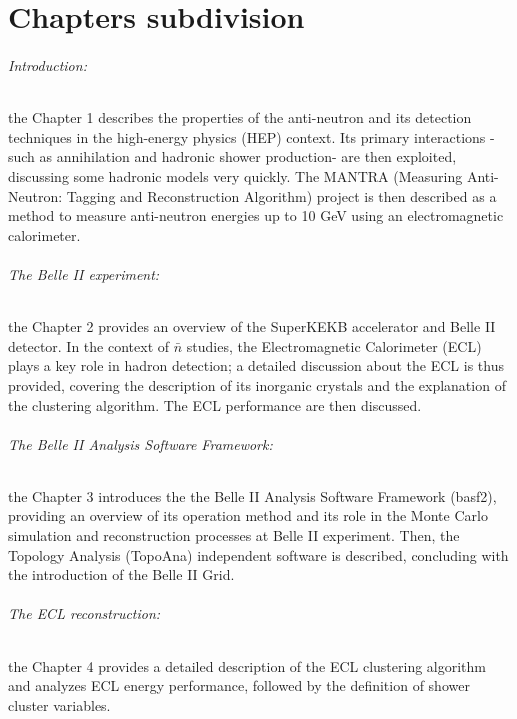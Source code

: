 \setcounter{subsection}{0} 
\part{Chapters subdivision}
\paragraph{Introduction:} the Chapter 1 describes the properties of the anti-neutron and its detection techniques in the high-energy physics (HEP) context. Its primary interactions -such as annihilation and hadronic shower production- are then exploited, discussing some hadronic models very quickly. The MANTRA (Measuring Anti-Neutron: Tagging and Reconstruction Algorithm) project is then described as a method to measure anti-neutron energies up to 10 GeV using an electromagnetic calorimeter.

\paragraph{The Belle II experiment:} the Chapter 2 provides an overview of the SuperKEKB accelerator and Belle II detector. In the context of $\bar{n}$ studies, the Electromagnetic Calorimeter (ECL) plays a key role in hadron detection; a detailed discussion about the ECL is thus provided, covering the description of its inorganic crystals and the explanation of the clustering algorithm. The ECL performance are then discussed.


\paragraph{The Belle II Analysis Software Framework:} the Chapter 3 introduces the the Belle II Analysis Software Framework (basf2), providing an overview of its operation method and its role in the Monte Carlo simulation and reconstruction processes at Belle II experiment. Then, the Topology Analysis (TopoAna) independent software is described, concluding with the introduction of the Belle II Grid.


\paragraph{The ECL reconstruction:} the Chapter 4 provides a detailed description of the ECL clustering algorithm and analyzes ECL energy performance, followed by the definition of shower cluster variables.

